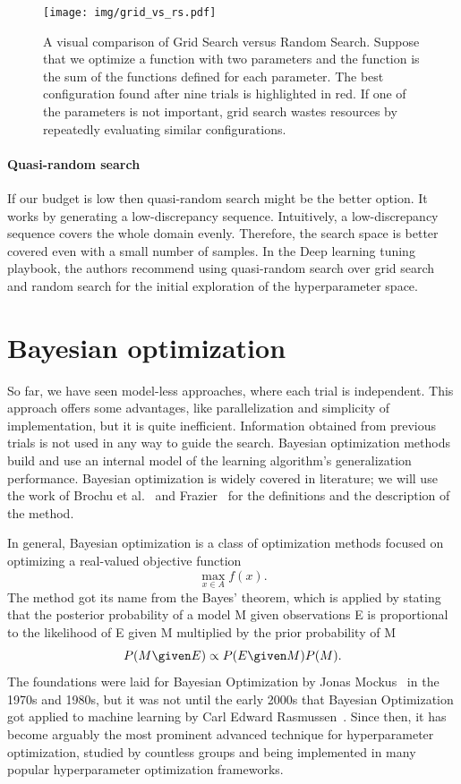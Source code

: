 \begin{figure}[H]
    \centering
    \texttt{[image: img/grid\_vs\_rs.pdf]}
    \caption{A visual comparison of Grid Search versus Random Search. Suppose that we optimize a function with two parameters and the function is the sum of the functions defined for each parameter. The best configuration found after nine trials is highlighted in red. If one of the parameters is not important, grid search wastes resources by repeatedly evaluating similar configurations. }
    \label{fig:grid}
\end{figure}

\paragraph{Quasi-random search} If our budget is low then quasi-random search might be the better option. It works by generating a low-discrepancy sequence. Intuitively, a low-discrepancy sequence covers the whole domain evenly. Therefore, the search space is better covered even with a small number of samples. In the Deep learning tuning playbook, the authors recommend using quasi-random search over grid search and random search for the initial exploration of the hyperparameter space.



\section{Bayesian optimization}
So far, we have seen model-less approaches, where each trial is independent. This approach offers some advantages, like parallelization and simplicity of implementation, but it is quite inefficient. Information obtained from previous trials is not used in any way to guide the search. Bayesian optimization methods build and use an internal model of the learning algorithm's generalization performance. Bayesian optimization is widely covered in literature; we will use the work of Brochu et al.~\cite{brochu2010tutorial} and Frazier~\cite{frazier2018tutorial} for the definitions and the description of the method.

In general, Bayesian optimization is a class of optimization methods focused on optimizing a real-valued objective function \[ \max_{x\in A} f(x). \] The method got its name from the Bayes' theorem, which is applied by stating that the posterior probability of a model M given observations E is proportional to the likelihood of E given M multiplied by the prior probability of M \[ P(M \given E) \propto P(E \given M)P(M).\] The foundations were laid for Bayesian Optimization by Jonas Mockus~\cite{mockus1974bayesian} in the 1970s and 1980s, but it was not until the early 2000s that Bayesian Optimization got applied to machine learning by Carl Edward Rasmussen~\cite{rasmussen2006gaussian}. Since then, it has become arguably the most prominent advanced technique for hyperparameter optimization, studied by countless groups and being implemented in many popular hyperparameter optimization frameworks.

